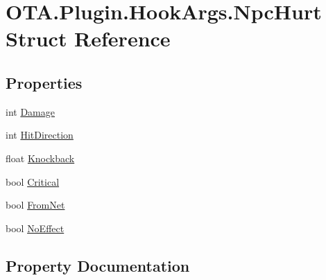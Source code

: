 \hypertarget{struct_o_t_a_1_1_plugin_1_1_hook_args_1_1_npc_hurt}{}\section{O\+T\+A.\+Plugin.\+Hook\+Args.\+Npc\+Hurt Struct Reference}
\label{struct_o_t_a_1_1_plugin_1_1_hook_args_1_1_npc_hurt}
\subsection*{Properties}
\begin{DoxyCompactItemize}
\item 
int \hyperlink{struct_o_t_a_1_1_plugin_1_1_hook_args_1_1_npc_hurt_a26b950193470b4bb15f367d580174b8d}{Damage}
\item 
int \hyperlink{struct_o_t_a_1_1_plugin_1_1_hook_args_1_1_npc_hurt_aad2081f7a3805d1d1cb59c47162a5265}{Hit\+Direction}
\item 
float \hyperlink{struct_o_t_a_1_1_plugin_1_1_hook_args_1_1_npc_hurt_a215178a2245002fc1203ffaa43f22ff2}{Knockback}
\item 
bool \hyperlink{struct_o_t_a_1_1_plugin_1_1_hook_args_1_1_npc_hurt_acc72875937941868eabbea316bfb51cc}{Critical}
\item 
bool \hyperlink{struct_o_t_a_1_1_plugin_1_1_hook_args_1_1_npc_hurt_a8eedcf8e17a53272e1ed5a6c7c207012}{From\+Net}
\item 
bool \hyperlink{struct_o_t_a_1_1_plugin_1_1_hook_args_1_1_npc_hurt_ab722724d6e83f577ddc8588eb351e377}{No\+Effect}
\end{DoxyCompactItemize}


\subsection{Property Documentation}
\hypertarget{struct_o_t_a_1_1_plugin_1_1_hook_args_1_1_npc_hurt_acc72875937941868eabbea316bfb51cc}{}
